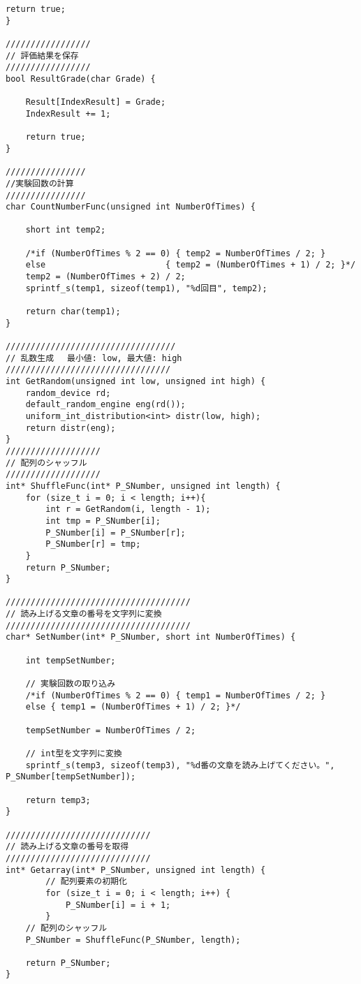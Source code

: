 \begin{lstlisting}[caption=main.cpp]
	return true;
}

/////////////////
// 評価結果を保存
/////////////////
bool ResultGrade(char Grade) {

	Result[IndexResult] = Grade;
	IndexResult += 1;

	return true;
}

////////////////
//実験回数の計算
////////////////
char CountNumberFunc(unsigned int NumberOfTimes) {

	short int temp2;

	/*if (NumberOfTimes % 2 == 0) { temp2 = NumberOfTimes / 2; }
	else                        { temp2 = (NumberOfTimes + 1) / 2; }*/
	temp2 = (NumberOfTimes + 2) / 2;
	sprintf_s(temp1, sizeof(temp1), "%d回目", temp2);

	return char(temp1);
}

//////////////////////////////////
// 乱数生成 　最小値: low, 最大値: high
/////////////////////////////////
int GetRandom(unsigned int low, unsigned int high) {
	random_device rd;
	default_random_engine eng(rd());
	uniform_int_distribution<int> distr(low, high);
	return distr(eng);
}
///////////////////
// 配列のシャッフル
///////////////////
int* ShuffleFunc(int* P_SNumber, unsigned int length) {
	for (size_t i = 0; i < length; i++){
		int r = GetRandom(i, length - 1);
		int tmp = P_SNumber[i];
		P_SNumber[i] = P_SNumber[r];
		P_SNumber[r] = tmp;
	}
	return P_SNumber;
}

/////////////////////////////////////
// 読み上げる文章の番号を文字列に変換
/////////////////////////////////////
char* SetNumber(int* P_SNumber, short int NumberOfTimes) {

	int tempSetNumber;
	
	// 実験回数の取り込み
	/*if (NumberOfTimes % 2 == 0) { temp1 = NumberOfTimes / 2; }
	else { temp1 = (NumberOfTimes + 1) / 2; }*/

	tempSetNumber = NumberOfTimes / 2;

	// int型を文字列に変換
	sprintf_s(temp3, sizeof(temp3), "%d番の文章を読み上げてください。", P_SNumber[tempSetNumber]);

	return temp3;
}

/////////////////////////////
// 読み上げる文章の番号を取得
/////////////////////////////
int* Getarray(int* P_SNumber, unsigned int length) {
		// 配列要素の初期化
		for (size_t i = 0; i < length; i++) {
			P_SNumber[i] = i + 1; 
		}
	// 配列のシャッフル
	P_SNumber = ShuffleFunc(P_SNumber, length);

	return P_SNumber;
}


\end{lstlisting}
